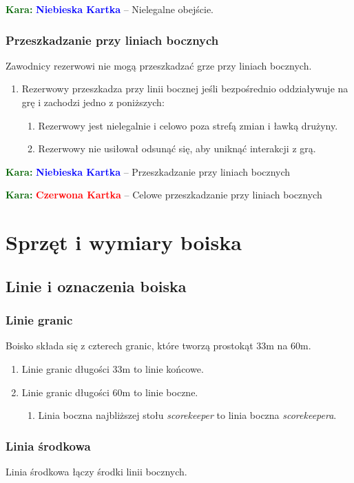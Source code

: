 \documentclass[11pt,a4paper]{article}
\newcommand\redcard[1]{\bgroup\textcolor{darkgreen}{\textbf{Kara: }}\bgroup\textcolor{red}{\textbf{Czerwona Kartka}} -- #1}
\newcommand\bluecard[1]{\bgroup\textcolor{darkgreen}{\textbf{Kara: }}\bgroup\textcolor{blue}{\textbf{Niebieska Kartka}} -- #1}
\begin{document}
\bluecard{Nielegalne obejście.}

\subsubsection{Przeszkadzanie przy liniach bocznych}
Zawodnicy rezerwowi nie mogą przeszkadzać grze przy liniach bocznych.
\begin{enumerate}
  \item Rezerwowy przeszkadza przy linii bocznej jeśli bezpośrednio oddziaływuje na grę i zachodzi jedno z poniższych:
  \begin{enumerate}
    \item Rezerwowy jest nielegalnie i celowo poza strefą zmian i ławką drużyny.
    \item Rezerwowy nie usiłował odsunąć się, aby uniknąć interakcji z grą.
  \end{enumerate}
\end{enumerate}

\bluecard{Przeszkadzanie przy liniach bocznych}

\redcard{Celowe przeszkadzanie przy liniach bocznych}

\section{Sprzęt i wymiary boiska}

\subsection{Linie i oznaczenia boiska}

\subsubsection{Linie granic}
Boisko składa się z czterech granic, które tworzą prostokąt 33m na 60m.
\begin{enumerate}
  \item Linie granic długości 33m to linie końcowe.
  \item Linie granic długości 60m to linie boczne.
  \begin{enumerate}
    \item Linia boczna najbliższej stołu \emph{scorekeeper} to linia boczna \emph{scorekeepera}.
  \end{enumerate}
\end{enumerate}

\subsubsection{Linia środkowa}
Linia środkowa łączy środki linii bocznych.
\end{document}

